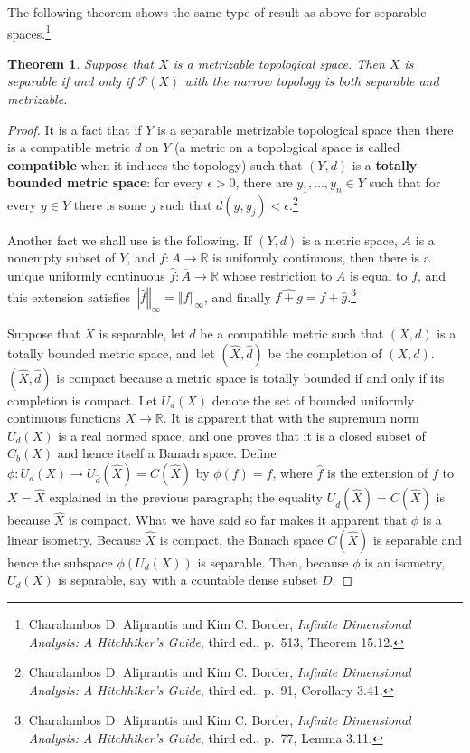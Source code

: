 \documentclass{article}
\newcommand{\norm}[1]{\left\Vert #1 \right\Vert}
\newtheorem{theorem}{Theorem}
\theoremstyle{definition}
\begin{document}
The following theorem shows the same type of result as above for separable spaces.\footnote{Charalambos D. 
Aliprantis and Kim C. Border, {\em Infinite Dimensional Analysis: A Hitchhiker's Guide}, third ed., p.~513, Theorem 15.12.}

\begin{theorem}
Suppose that $X$ is a metrizable topological space. Then $X$ is separable if and only if $\mathscr{P}(X)$ with the narrow topology  is
both separable and metrizable.
\label{Pseparable}
\end{theorem}
\begin{proof}
It is a fact that if $Y$ is a separable metrizable topological space then there is a compatible metric $d$ on $Y$ (a metric
on a topological space is called \textbf{compatible} when it induces the topology) such that $(Y,d)$ is a \textbf{totally bounded metric space}:
for every $\epsilon>0$, there are $y_1,\ldots,y_n \in Y$ such that for every $y \in Y$ there is some $j$ such that $d(y,y_j)<\epsilon$.\footnote{Charalambos D. 
Aliprantis and Kim C. Border, {\em Infinite Dimensional Analysis: A Hitchhiker's Guide}, third ed., p.~91, Corollary 3.41.}

Another fact we shall use is the following. If $(Y,d)$ is a metric space, $A$ is a nonempty subset of $Y$, and
$f:A \to \mathbb{R}$ is uniformly continuous, then there is a unique uniformly continuous $\hat{f}:\overline{A} \to \mathbb{R}$
whose restriction to $A$ is equal to $f$, and this extension satisfies $\norm{\hat{f}}_\infty  = \norm{f}_\infty$, and finally $\widehat{f+g}=\hat{f}+\hat{g}$.\footnote{Charalambos D. 
Aliprantis and Kim C. Border, {\em Infinite Dimensional Analysis: A Hitchhiker's Guide}, third ed., p.~77, Lemma 3.11.}

Suppose that $X$ is separable, let $d$ be a compatible metric such that $(X,d)$ is a totally bounded metric space,
and let $(\hat{X},\hat{d})$ be the completion of $(X,d)$. $(\hat{X},\hat{d})$ is compact because a metric space is totally bounded if and only if its
completion is compact. Let $U_d(X)$ denote the set of bounded uniformly continuous functions $X \to \mathbb{R}$. It is apparent that with the supremum
norm $U_d(X)$ is a real normed space, and one proves that it is a closed subset of $C_b(X)$ and hence itself a Banach space.
Define $\phi:U_d(X) \to U_{\hat{d}}(\hat{X})=C(\hat{X})$ by $\phi(f)=\hat{f}$, where $\hat{f}$ is the extension of $f$ to $\overline{X}=\hat{X}$ explained in the previous paragraph;
the equality $U_{\hat{d}}(\hat{X})=C(\hat{X})$ is because $\hat{X}$ is compact. What we have said so far makes it apparent that  $\phi$ is a linear isometry.
Because $\hat{X}$ is compact, the Banach space $C(\hat{X})$ is separable
and hence the subspace $\phi(U_d(X))$  is separable. Then, because $\phi$ is an isometry,
$U_d(X)$ is separable, say with a countable dense subset
$D$. 


\end{proof}
\end{document}
